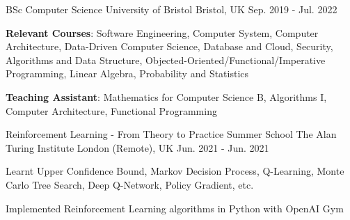 

\begin{cventries}

  \cventry
    {BSc Computer Science} %
    {University of Bristol} %
    {Bristol, UK} %
    {Sep. 2019 - Jul. 2022} %
    {
      \begin{cvitems} %
        \item {\textbf{Relevant Courses}: Software Engineering, Computer System, Computer Architecture, Data-Driven Computer Science, Database and Cloud, Security, Algorithms and Data Structure, Objected-Oriented/Functional/Imperative Programming, Linear Algebra, Probability and Statistics}
        \item {\textbf{Teaching Assistant}: Mathematics for Computer Science B, Algorithms I, Computer Architecture, Functional Programming}
      \end{cvitems}
    }
    
  \cventry
    {Reinforcement Learning - From Theory to Practice Summer School} %
    {The Alan Turing Institute} %
    {London (Remote), UK} %
    {Jun. 2021 - Jun. 2021} %
    {
      \begin{cvitems} %
        \item {Learnt Upper Confidence Bound, Markov Decision Process, Q-Learning, Monte Carlo Tree Search, Deep Q-Network, Policy Gradient, etc.}
        \item {Implemented Reinforcement Learning algorithms in Python with OpenAI Gym}
      \end{cvitems}
    }

\end{cventries}
